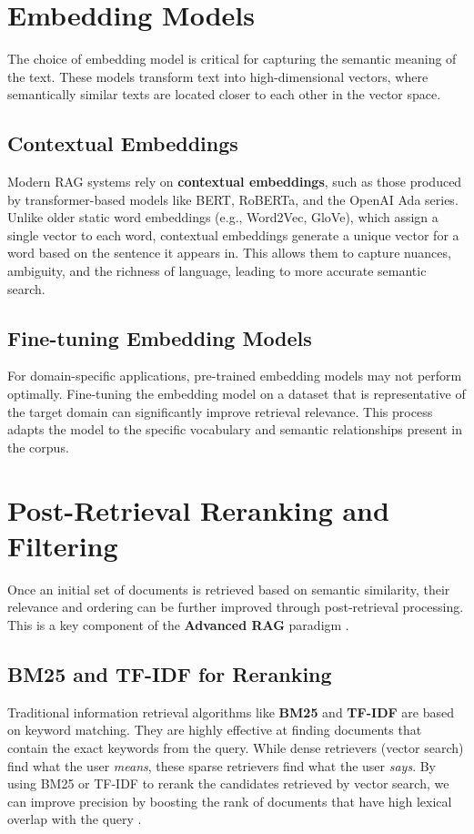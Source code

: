 \section{Embedding Models}
The choice of embedding model is critical for capturing the semantic meaning of the text. These models transform text into high-dimensional vectors, where semantically similar texts are located closer to each other in the vector space.

\subsection{Contextual Embeddings}
Modern RAG systems rely on \textbf{contextual embeddings}, such as those produced by transformer-based models like BERT, RoBERTa, and the OpenAI Ada series. Unlike older static word embeddings (e.g., Word2Vec, GloVe), which assign a single vector to each word, contextual embeddings generate a unique vector for a word based on the sentence it appears in. This allows them to capture nuances, ambiguity, and the richness of language, leading to more accurate semantic search.

\subsection{Fine-tuning Embedding Models}
For domain-specific applications, pre-trained embedding models may not perform optimally. Fine-tuning the embedding model on a dataset that is representative of the target domain can significantly improve retrieval relevance. This process adapts the model to the specific vocabulary and semantic relationships present in the corpus.

\section{Post-Retrieval Reranking and Filtering}
Once an initial set of documents is retrieved based on semantic similarity, their relevance and ordering can be further improved through post-retrieval processing. This is a key component of the \textbf{Advanced RAG} paradigm \autocite{gao2024retrievalaugmented}.

\subsection{BM25 and TF-IDF for Reranking}
Traditional information retrieval algorithms like \textbf{BM25} and \textbf{TF-IDF} are based on keyword matching. They are highly effective at finding documents that contain the exact keywords from the query. While dense retrievers (vector search) find what the user \textit{means}, these sparse retrievers find what the user \textit{says}. By using BM25 or TF-IDF to rerank the candidates retrieved by vector search, we can improve precision by boosting the rank of documents that have high lexical overlap with the query \autocite{gao2024retrievalaugmented}.

